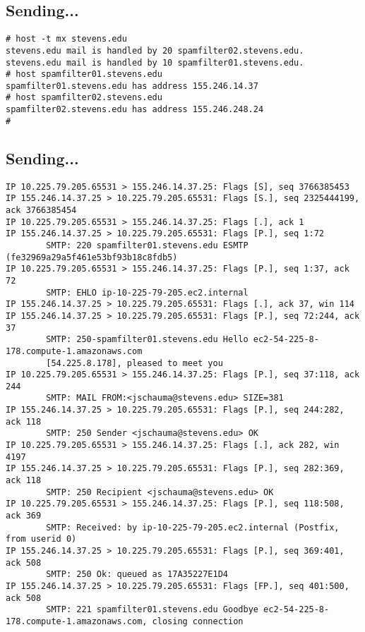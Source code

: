 \documentclass[xga]{xdvislides}
\begin{document}
\subsection{Sending...}
\begin{verbatim}
# host -t mx stevens.edu
stevens.edu mail is handled by 20 spamfilter02.stevens.edu.
stevens.edu mail is handled by 10 spamfilter01.stevens.edu.
# host spamfilter01.stevens.edu
spamfilter01.stevens.edu has address 155.246.14.37
# host spamfilter02.stevens.edu
spamfilter02.stevens.edu has address 155.246.248.24
#
\end{verbatim}

\subsection{Sending...}
\smallish
\begin{verbatim}
IP 10.225.79.205.65531 > 155.246.14.37.25: Flags [S], seq 3766385453
IP 155.246.14.37.25 > 10.225.79.205.65531: Flags [S.], seq 2325444199, ack 3766385454
IP 10.225.79.205.65531 > 155.246.14.37.25: Flags [.], ack 1
IP 155.246.14.37.25 > 10.225.79.205.65531: Flags [P.], seq 1:72
        SMTP: 220 spamfilter01.stevens.edu ESMTP (fe32969a29a5f461e53bf93b18c8fdb5)
IP 10.225.79.205.65531 > 155.246.14.37.25: Flags [P.], seq 1:37, ack 72
        SMTP: EHLO ip-10-225-79-205.ec2.internal
IP 155.246.14.37.25 > 10.225.79.205.65531: Flags [.], ack 37, win 114
IP 155.246.14.37.25 > 10.225.79.205.65531: Flags [P.], seq 72:244, ack 37
        SMTP: 250-spamfilter01.stevens.edu Hello ec2-54-225-8-178.compute-1.amazonaws.com
        [54.225.8.178], pleased to meet you
IP 10.225.79.205.65531 > 155.246.14.37.25: Flags [P.], seq 37:118, ack 244
        SMTP: MAIL FROM:<jschauma@stevens.edu> SIZE=381
IP 155.246.14.37.25 > 10.225.79.205.65531: Flags [P.], seq 244:282, ack 118
        SMTP: 250 Sender <jschauma@stevens.edu> OK
IP 10.225.79.205.65531 > 155.246.14.37.25: Flags [.], ack 282, win 4197
IP 155.246.14.37.25 > 10.225.79.205.65531: Flags [P.], seq 282:369, ack 118
        SMTP: 250 Recipient <jschauma@stevens.edu> OK
IP 10.225.79.205.65531 > 155.246.14.37.25: Flags [P.], seq 118:508, ack 369
        SMTP: Received: by ip-10-225-79-205.ec2.internal (Postfix, from userid 0)
IP 155.246.14.37.25 > 10.225.79.205.65531: Flags [P.], seq 369:401, ack 508
        SMTP: 250 Ok: queued as 17A35227E1D4
IP 155.246.14.37.25 > 10.225.79.205.65531: Flags [FP.], seq 401:500, ack 508
        SMTP: 221 spamfilter01.stevens.edu Goodbye ec2-54-225-8-178.compute-1.amazonaws.com, closing connection
\end{verbatim}
\Normalsize
\end{document}
